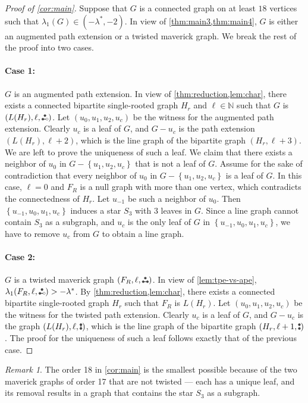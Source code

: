 \documentclass[11pt]{article}
\theoremstyle{definition}
\theoremstyle{remark}
\newtheorem*{remark}{Remark}
\newcommand{\sset}[1]{\left\{{#1}\right\}}
\newcommand{\la}{\lambda}
\newcommand{\las}{\lambda^*}
\newcommand{\N}{\mathbb{N}}
\newcommand{\etwo}{\tikz[baseline=-0.2ex, scale=0.9]{\draw[darkgray, thick] (0,0)--(0.2,0); \draw[darkgray, fill=darkgray] (0,0) circle (0.05); \draw[darkgray, fill=darkgray] (0.1,0.17320508075) circle (0.05); \draw[darkgray, fill=white] (0.2,0) circle (0.05);}}
\newcommand{\ftwo}{\tikz[baseline=-0.2ex, scale=0.9]{\draw[darkgray, thick] (0,0)--(0.2,0); \draw[darkgray, fill=darkgray] (0,0) circle (0.05); \draw[darkgray, fill=darkgray] (0.1,0.17320508075) circle (0.05); \draw[darkgray, fill=darkgray] (0.2,0) circle (0.05);}}
\newcommand{\ktwo}{\tikz[baseline=-0.2ex, scale=0.9]{\draw[darkgray, thick] (0,0)--(0,0.17320508075); \draw[darkgray, fill=darkgray] (0,0) circle (0.05); \draw[darkgray, fill=darkgray] (0,0.17320508075) circle (0.05);}}
\newcommand{\ktwoc}{\tikz[baseline=-0.2ex, scale=0.9]{\draw[darkgray, fill=darkgray] (0,0) circle (0.05); \draw[darkgray, fill=darkgray] (0,0.17320508075) circle (0.05);}}
\newcommand{\ape}[1]{(#1,\etwo)}
\newcommand{\tpe}[1]{(#1,\ftwo)}
\begin{document}
\begin{proof}[Proof of \cref{cor:main}]
    Suppose that $G$ is a connected graph on at least $18$ vertices such that $\la_1(G) \in (-\las, -2)$.
    In view of \cref{thm:main3,thm:main4}, $G$ is either an augmented path extension or a twisted maverick graph. We break the rest of the proof into two cases.
    
    \paragraph{Case 1:} $G$ is an augmented path extension. In view of \cref{thm:reduction,lem:char}, there exists a connected bipartite single-rooted graph $H_r$ and $\ell \in \N$ such that $G$ is $\ape{L(H_r),\ell}$. Let $(u_0, u_1, u_2, u_c)$ be the witness for the augmented path extension. Clearly $u_c$ is a leaf of $G$, and $G - u_c$ is the path extension $(L(H_r), \ell+2)$, which is the line graph of the bipartite graph $(H_r, \ell+3)$. We are left to prove the uniqueness of such a leaf. We claim that there exists a neighbor of $u_0$ in $G - \sset{u_1,u_2,u_c}$ that is not a leaf of $G$. Assume for the sake of contradiction that every neighbor of $u_0$ in $G - \sset{u_1,u_2,u_c}$ is a leaf of $G$. In this case, $\ell = 0$ and $F_R$ is a null graph with more than one vertex, which contradicts the connectedness of $H_r$. Let $u_{-1}$ be such a neighbor of $u_0$. Then $\sset{u_{-1},u_0,u_1,u_c}$ induces a star $S_3$ with $3$ leaves in $G$. Since a line graph cannot contain $S_3$ as a subgraph, and $u_c$ is the only leaf of $G$ in $\sset{u_{-1},u_0,u_1,u_c}$, we have to remove $u_c$ from $G$ to obtain a line graph.

    \paragraph{Case 2:} $G$ is a twisted maverick graph $\tpe{F_R, \ell}$. In view of \cref{lem:tpe-vs-ape}, $\la_1\ape{F_R, \ell} > -\las$. By \cref{thm:reduction,lem:char}, there exists a connected bipartite single-rooted graph $H_r$ such that $F_R$ is $L(H_r)$. Let $(u_0,u_1,u_2,u_c)$ be the witness for the twisted path extension. Clearly $u_c$ is a leaf of $G$, and $G - u_c$ is the graph $(L(H_r),\ell,\ktwo)$, which is the line graph of the bipartite graph $(H_r,\ell+1,\ktwoc)$. The proof for the uniqueness of such a leaf follows exactly that of the previous case.
\end{proof}

\begin{remark}
    The order 18 in \cref{cor:main} is the smallest possible because of the two maverick graphs of order 17 that are not twisted --- each has a unique leaf, and its removal results in a graph that contains the star $S_3$ as a subgraph.
\end{remark}
\end{document}
